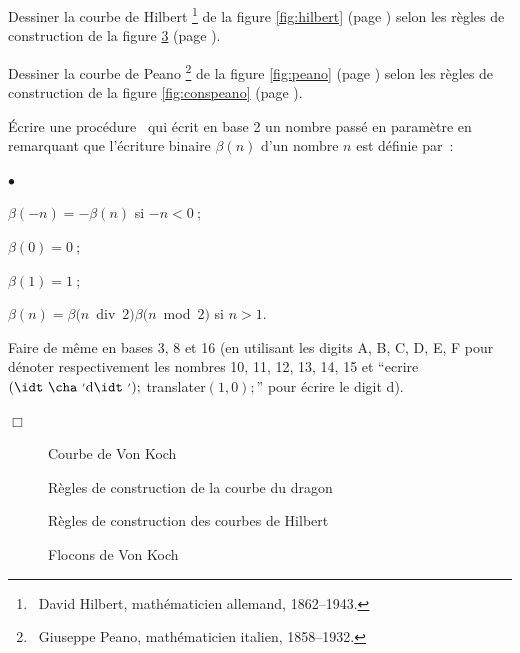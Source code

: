 \begin{exercice}
{\tiret Dessiner la courbe de Hilbert\/%
\footnote{\ David Hilbert, mathématicien allemand, 1862--1943.}
de la figure \ref{fig:hilbert}  (page \pageref{fig:hilbert}) selon les règles de construction de
la figure \ref{fig:conshilbert}  (page \pageref{fig:conshilbert}).

\tiret Dessiner la courbe de Peano\/%
\footnote{\ Giuseppe Peano, mathématicien italien, 1858--1932.}
 de la figure \ref{fig:peano}  (page \pageref{fig:peano}) selon les règles de construction de
la figure \ref{fig:conspeano}  (page \pageref{fig:conspeano}).

\tiret Écrire une procédure \pascal\ qui écrit en base 2 un nombre passé en paramètre
en remarquant que l'écriture binaire $\beta(n)$ d'un nombre $n$ est définie par~:
\begin{list}{$\scriptscriptstyle\bullet$}{
}
  \item $\beta(-n) = -\beta(n)$ si $-n < 0$$\:$;
  \item $\beta(0) = 0$$\:$;
 \item $\beta(1) = 1$$\:$;
 \item $\beta(n) = \beta(n $\ {\idt div}\ $ 2) \beta(n$\ {\idt mod}\ $2)$ si $n > 1$.
\end{list}
Faire de même en bases 3, 8 et 16 (en utilisant les digits {\idt A}, {\idt B}, {\idt C}, {\idt D},
{\idt E}, {\idt F} pour dénoter respectivement les nombres 10, 11, 12, 13, 14, 15 et 
``{\idt ecrire$(\mbox{\idt  \cha $\scriptstyle '$d\idt $\scriptstyle '$});$ translater$(1, 0);$}'' 
pour écrire le digit \mbox{\cha d}).

\noindent $\Box$}\end{exercice}
\begin{figure}[htbp]
 \caption{Courbe de Von Koch}\label{fig:segvonkoch}
\end{figure}
\begin{figure}[htbp]
 \caption{Règles de construction de la courbe du dragon}\label{fig:consdragon}
\end{figure}
\begin{figure}[htbp]
 \caption{Règles de construction des courbes de Hilbert}\label{fig:conshilbert}
\end{figure}
\begin{figure}[htbp]
 \caption{Flocons de Von Koch}\label{fig:flocvonkoch}
\end{figure}
